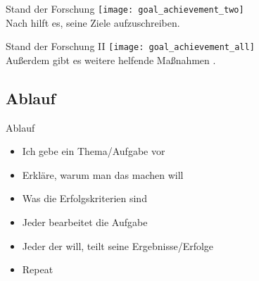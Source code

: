 
\begin{frame}[c]{Stand der Forschung}
    \texttt{[image: goal\_achievement\_two]} \\
    Nach \cite{better-goals-2} hilft es, seine Ziele aufzuschreiben.
\end{frame}

\begin{frame}[c]{Stand der Forschung II}
    \texttt{[image: goal\_achievement\_all]} \\
    Außerdem gibt es weitere helfende Maßnahmen \cite{better-goals-2}.
\end{frame}



\subsection{Ablauf}


\begin{frame}[c]{Ablauf}
    \begin{itemize}[<+(1)->]
        \item Ich gebe ein Thema/Aufgabe vor
        \item Erkläre, warum man das machen will
        \item Was die Erfolgskriterien sind
        \item Jeder bearbeitet die Aufgabe
        \item Jeder der will, teilt seine Ergebnisse/Erfolge
        \item Repeat
    \end{itemize}
\end{frame}


